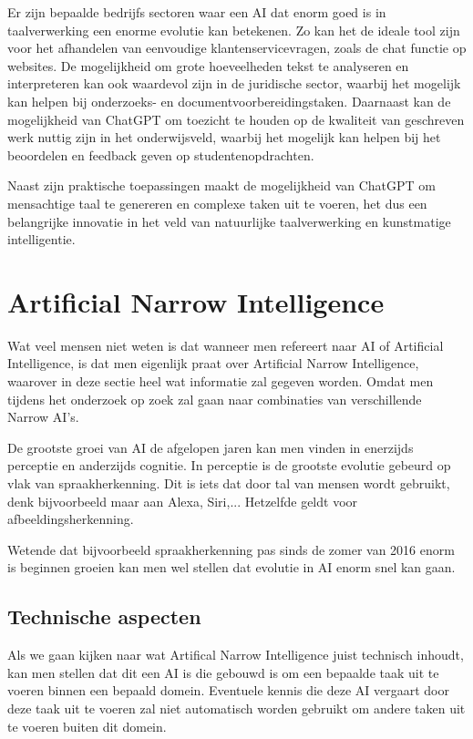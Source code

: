 Er zijn bepaalde bedrijfs sectoren waar een AI dat enorm goed is in taalverwerking een enorme evolutie kan betekenen. Zo kan het de ideale tool zijn voor het afhandelen van eenvoudige klantenservicevragen, zoals de chat functie op websites. De mogelijkheid om grote hoeveelheden tekst te analyseren en interpreteren kan ook waardevol zijn in de juridische sector, waarbij het mogelijk kan helpen bij onderzoeks- en documentvoorbereidingstaken. Daarnaast kan de mogelijkheid van ChatGPT om toezicht te houden op de kwaliteit van geschreven werk nuttig zijn in het onderwijsveld, waarbij het mogelijk kan helpen bij het beoordelen en feedback geven op studentenopdrachten.

Naast zijn praktische toepassingen maakt de mogelijkheid van ChatGPT om mensachtige taal te genereren en complexe taken uit te voeren, het dus een belangrijke innovatie in het veld van natuurlijke taalverwerking en kunstmatige intelligentie.

\cite{lund2023chatting}

\section{Artificial Narrow Intelligence}

Wat veel mensen niet weten is dat wanneer men refereert naar AI of Artificial Intelligence, is dat men eigenlijk praat over Artificial Narrow Intelligence, waarover in deze sectie heel wat informatie zal gegeven worden. Omdat men tijdens het onderzoek op zoek zal gaan naar combinaties van verschillende Narrow AI's.

De grootste groei van AI de afgelopen jaren kan men vinden in enerzijds perceptie en anderzijds cognitie. In perceptie is de grootste evolutie gebeurd op vlak van spraakherkenning. Dit is iets dat door tal van mensen wordt gebruikt, denk bijvoorbeeld maar aan Alexa, Siri,... Hetzelfde geldt voor afbeeldingsherkenning.

Wetende dat bijvoorbeeld spraakherkenning pas sinds de zomer van 2016 enorm is beginnen groeien kan men wel stellen dat evolutie in AI enorm snel kan gaan.

 \autocite{brynjolfsson2017artificial}

\subsection{Technische aspecten}

Als we gaan kijken naar wat Artifical Narrow Intelligence juist technisch inhoudt, kan men stellen dat dit een AI is die gebouwd is om een bepaalde taak uit te voeren binnen een bepaald domein. Eventuele kennis die deze AI vergaart door deze taak uit te voeren zal niet automatisch worden gebruikt om andere taken uit te voeren buiten dit domein. 

